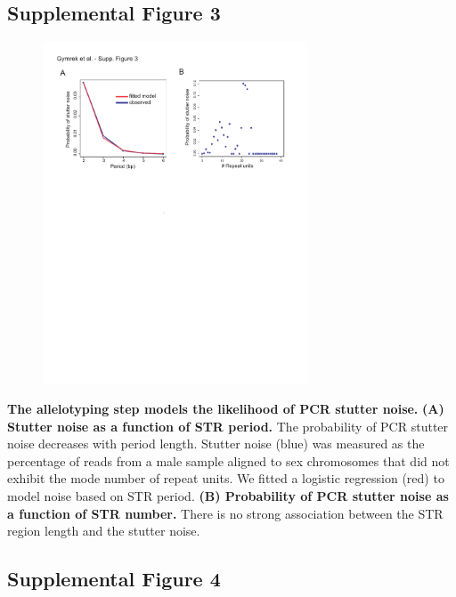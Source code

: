 \pagebreak
\subsection{Supplemental Figure 3}

\begin{figure}[h!]
\centering
\label{fig:lobsup3}
\includegraphics[width=0.7\textwidth]{Figures/Chapter2/SuppFig3.pdf}
\end{figure}
\textbf{The allelotyping step models the likelihood of PCR stutter noise.} \textbf{(A) Stutter noise as a function of STR period.} The probability of PCR stutter noise decreases with period length. Stutter noise (blue) was measured as the percentage of reads from a male sample aligned to sex chromosomes that did not exhibit the mode number of repeat units. We fitted a logistic regression (red) to model noise based on STR period. \textbf{(B) Probability of PCR stutter noise as a function of STR number.} There is no strong association between the STR region length and the stutter noise. 

\pagebreak
\subsection{Supplemental Figure 4}

